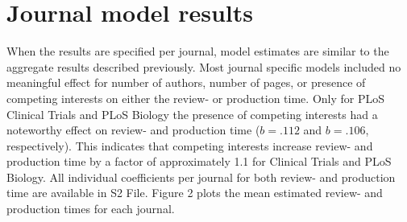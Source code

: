 \section*{Journal model results}
When the results are specified per journal, model estimates are similar to the aggregate results described previously. Most journal specific models included no meaningful effect for number of authors, number of pages, or presence of competing interests on either the review- or production time. Only for PLoS Clinical Trials and PLoS Biology the presence of competing interests had a noteworthy effect on review- and production time ($b=.112$ and $b=.106$, respectively). This indicates that competing interests increase review- and production time by a factor of approximately 1.1 for Clinical Trials and PLoS Biology. All individual coefficients per journal for both review- and production time are available in S2 File. Figure 2 plots the mean estimated review- and production times for each journal.
  